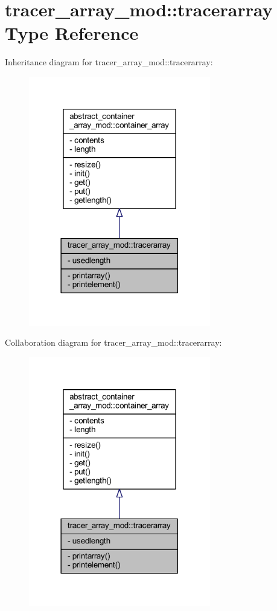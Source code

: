 \hypertarget{structtracer__array__mod_1_1tracerarray}{}\section{tracer\+\_\+array\+\_\+mod\+:\+:tracerarray Type Reference}
\label{structtracer__array__mod_1_1tracerarray}


Inheritance diagram for tracer\+\_\+array\+\_\+mod\+:\+:tracerarray\+:\nopagebreak
\begin{figure}[H]
\begin{center}
\leavevmode
\includegraphics[width=225pt]{structtracer__array__mod_1_1tracerarray__inherit__graph}
\end{center}
\end{figure}


Collaboration diagram for tracer\+\_\+array\+\_\+mod\+:\+:tracerarray\+:\nopagebreak
\begin{figure}[H]
\begin{center}
\leavevmode
\includegraphics[width=225pt]{structtracer__array__mod_1_1tracerarray__coll__graph}
\end{center}
\end{figure}
